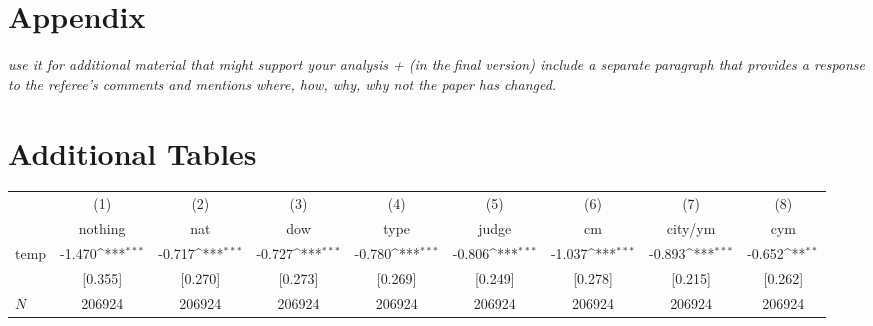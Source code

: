 \documentclass[11pt]{article}
\begin{document}
	\begin{subappendices}
		\appendix
		
		\section*{Appendix}\label{Appendix}
		\textit{use it for additional material that might support your analysis + (in thefinal version) include a separate paragraph that provides a response to the referee's comments and mentions where, how, why, why not the paper has changed.}
		\singlespacing
		\section{Additional Tables}\label{ASec:xxxxx}
		

		
		\begin{center}
			 \label{tab:title} 
			{
				{
					\def\sym#1{\ifmmode^{#1}\else\(^{#1}\)\fi}
					\begin{tabular}{l*{8}{c}}
						\hline\hline
						&\multicolumn{1}{c}{(1)}&\multicolumn{1}{c}{(2)}&\multicolumn{1}{c}{(3)}&\multicolumn{1}{c}{(4)}&\multicolumn{1}{c}{(5)}&\multicolumn{1}{c}{(6)}&\multicolumn{1}{c}{(7)}&\multicolumn{1}{c}{(8)}\\
						&\multicolumn{1}{c}{nothing}&\multicolumn{1}{c}{nat}&\multicolumn{1}{c}{dow}&\multicolumn{1}{c}{type}&\multicolumn{1}{c}{judge}&\multicolumn{1}{c}{cm}&\multicolumn{1}{c}{city/ym}&\multicolumn{1}{c}{cym}\\
						\hline
						temp   &      -1.470\sym{***}&      -0.717\sym{***}&      -0.727\sym{***}&      -0.780\sym{***}&      -0.806\sym{***}&      -1.037\sym{***}&      -0.893\sym{***} &      -0.652\sym{**}   \\
						&     [0.355]         &     [0.270]         &     [0.273]         &     [0.269]         &     [0.249]         &     [0.278]         &     [0.215]        &     [0.262]  \\
						\hline
						\(N\)       &      206924         &      206924         &      206924         &      206924         &      206924         &      206924         &      206924 &      206924      \\
						\hline\hline
					\end{tabular}
				}
			}
		\end{center}			
		\begin{center}	
			

\end{center}
\end{subappendices}
\end{document}
